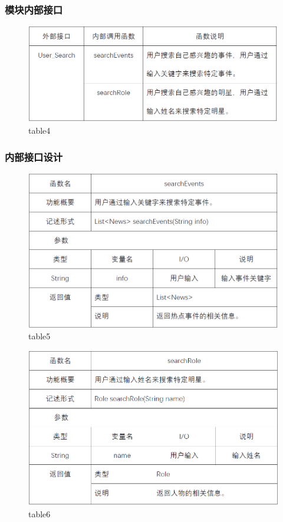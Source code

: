 \subsubsection{模块内部接口}
\begin{figure}[!htb]
	\centering
	\includegraphics[scale=1]{image/b4.png} %
	\caption{table4} %
\end{figure}
\subsubsection{内部接口设计}
\begin{figure}[!htb]
	\centering
	\includegraphics[scale=1]{image/b5.png} %
	\caption{table5} %
\end{figure}
\begin{figure}[!htb]
	\centering
	\includegraphics[scale=1]{image/b6.png} %
	\caption{table6} %
\end{figure}

